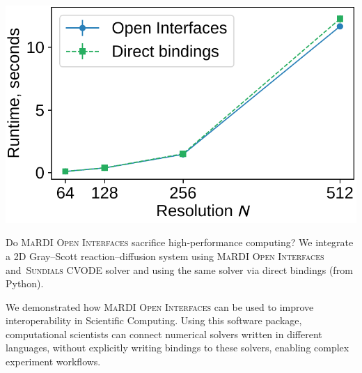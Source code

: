 \documentclass[a0paper, twocolumn, csc, english, final]{mpi2015_poster}
\newcommand{\OIF}{\textsc{MaRDI Open Interfaces}\xspace}
\begin{document}
\begin{poster}
\begin{pcolumn}
\begin{pbox}
      \begin{minipage}{\dimexpr0.58\columnwidth - 2\tabcolsep}
        \centering
      \includegraphics[width=0.8\columnwidth]{ivp_cvode_gs_performance}
      \end{minipage}\hfill%
      \begin{minipage}{\dimexpr0.42\columnwidth - 2\tabcolsep}
        Do \OIF{} sacrifice high-performance computing? We integrate
        a 2D Gray--Scott reaction--diffusion system using \OIF{}
        and~\textsc{Sundials CVODE} solver and using the same solver
        via direct bindings (from Python).

      \end{minipage}
    \end{pbox}
    \begin{pbox}
      \large
      We demonstrated how \OIF{} can be used to improve
      interoperability in Scientific Computing.
      Using this software package, computational scientists can connect numerical
      solvers written in different languages, without explicitly writing bindings
      to these solvers, enabling complex experiment workflows.


\end{pbox}
\end{pcolumn}
\end{poster}
\end{document}

